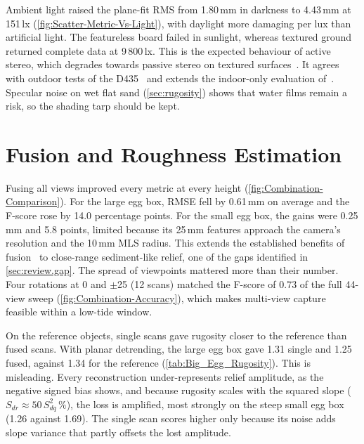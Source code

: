 Ambient light raised the plane-fit RMS from 1.80\,mm in darkness to 4.43\,mm at 151\,lx (\autoref{fig:Scatter-Metric-Vs-Light}), with daylight more damaging per lux than artificial light. The featureless board failed in sunlight, whereas textured ground returned complete data at 9\,800\,lx. This is the expected behaviour of active stereo, which degrades towards passive stereo on textured surfaces~\cite{keselmanIntelRRealSenseTMStereoscopic2017}. It agrees with outdoor tests of the D435~\cite{vitComparingRGBDSensors2018} and extends the indoor-only evaluation of~\cite{halmetschlager-funekEmpiricalEvaluationTen2019}. Specular noise on wet flat sand (\autoref{sec:rugosity}) shows that water films remain a risk, so the shading tarp should be kept.

\section{Fusion and Roughness Estimation}

Fusing all views improved every metric at every height (\autoref{fig:Combination-Comparison}). For the large egg box, RMSE fell by 0.61\,mm on average and the F-score rose by 14.0 percentage points. For the small egg box, the gains were 0.25\,mm and 5.8 points, limited because its 25\,mm features approach the camera's resolution and the 10\,mm MLS radius. This extends the established benefits of fusion~\cite{curlessVolumetricMethodBuilding1996,newcombeKinectFusionRealtimeDense2011} to close-range sediment-like relief, one of the gaps identified in \autoref{sec:review.gap}. The spread of viewpoints mattered more than their number. Four rotations at 0\textdegree{} and $\pm$25\textdegree{} (12 scans) matched the F-score of 0.73 of the full 44-view sweep (\autoref{fig:Combination-Accuracy}), which makes multi-view capture feasible within a low-tide window.

On the reference objects, single scans gave rugosity closer to the reference than fused scans. With planar detrending, the large egg box gave 1.31 single and 1.25 fused, against 1.34 for the reference (\autoref{tab:Big_Egg_Rugosity}). This is misleading. Every reconstruction under-represents relief amplitude, as the negative signed bias shows, and because rugosity scales with the squared slope ($S_{dr}\approx 50\,S_{dq}^2\,\%$), the loss is amplified, most strongly on the steep small egg box (1.26 against 1.69). The single scan scores higher only because its noise adds slope variance that partly offsets the lost amplitude.

